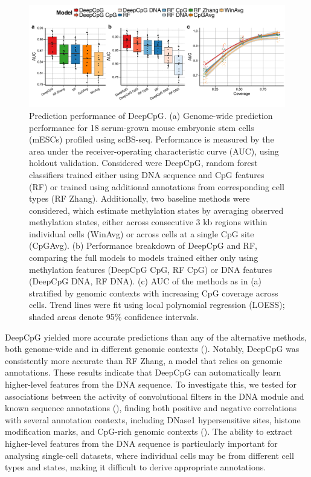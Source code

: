 \begin{figure}[htbp!]
\centering
\includegraphics[width=1.0\textwidth]{eval_global}
\caption[Prediction performance of DeepCpG.]{Prediction performance of DeepCpG. (a) Genome-wide prediction performance for 18 serum-grown mouse embryonic stem cells (mESCs) profiled using scBS-seq. Performance is measured by the area under the receiver-operating characteristic curve (AUC), using holdout validation. Considered were DeepCpG, random forest classifiers trained either using DNA sequence and CpG features (RF) or trained using additional annotations from corresponding cell types (RF Zhang). Additionally, two baseline methods were considered, which estimate methylation states by averaging observed methylation states, either across consecutive 3 kb regions within individual cells (WinAvg) or across cells at a single CpG site (CpGAvg). (b) Performance breakdown of DeepCpG and RF, comparing the full models to models trained either only using methylation features (DeepCpG CpG, RF CpG) or DNA features (DeepCpG DNA, RF DNA). (c) AUC of the methods as in (a) stratified by genomic contexts with increasing CpG coverage across cells. Trend lines were fit using local polynomial regression (LOESS); shaded areas denote 95\% confidence intervals.}
\label{fig:dcpg_eval}
\end{figure}

DeepCpG yielded more accurate predictions than any of the alternative methods, both genome-wide and in different genomic contexts (). Notably, DeepCpG was consistently more accurate than RF Zhang, a model that relies on genomic annotations. These results indicate that DeepCpG can automatically learn higher-level features from the DNA sequence. To investigate this, we tested for associations between the activity of convolutional filters in the DNA module and known sequence annotations (), finding both positive and negative correlations with several annotation contexts, including DNase1 hypersensitive sites, histone modification marks, and CpG-rich genomic contexts (). The ability to extract higher-level features from the DNA sequence is particularly important for analysing single-cell datasets, where individual cells may be from different cell types and states, making it difficult to derive appropriate annotations.

